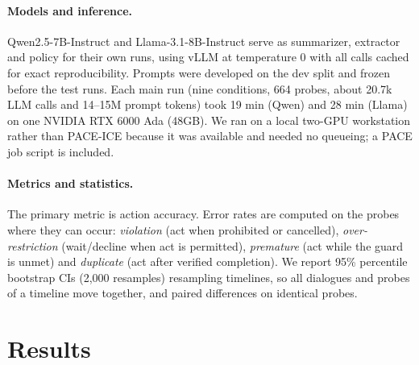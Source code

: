 \documentclass[11pt]{article}
\newcommand{\ours}{\textsc{LADL}\xspace}
\begin{document}
\paragraph{Models and inference.} Qwen2.5-7B-Instruct and Llama-3.1-8B-Instruct serve as summarizer, extractor and policy for their own runs, using vLLM \citep{kwon2023vllm} at temperature 0 with all calls cached for exact reproducibility. Prompts were developed on the dev split and frozen before the test runs. Each main run (nine conditions, 664 probes, about 20.7k LLM calls and 14--15M prompt tokens) took 19 min (Qwen) and 28 min (Llama) on one NVIDIA RTX 6000 Ada (48GB). We ran on a local two-GPU workstation rather than PACE-ICE because it was available and needed no queueing; a PACE job script is included.

\paragraph{Metrics and statistics.} The primary metric is action accuracy. Error rates are computed on the probes where they can occur: \emph{violation} (act when prohibited or cancelled), \emph{over-restriction} (wait/decline when act is permitted), \emph{premature} (act while the guard is unmet) and \emph{duplicate} (act after verified completion). We report 95\% percentile bootstrap CIs (2{,}000 resamples) resampling timelines, so all dialogues and probes of a timeline move together, and paired differences on identical probes.

\section{Results}
\label{sec:results}

\begin{table}[t]
\centering\small\setlength{\tabcolsep}{3pt}
\resizebox{\columnwidth}{!}{}
\caption{Action accuracy (\%) with timeline-clustered 95\% CIs, and state-recall accuracy (State, \%) on 664 test probes at $B{=}384$. Bold: best compacted condition per model. Rows below the rule are diagnostics and ablations.}
\label{tab:main}
\end{table}

\begin{table}[t]
\centering\small\setlength{\tabcolsep}{3pt}
\resizebox{\columnwidth}{!}{}
\caption{Paired accuracy difference, \ours minus baseline, in percentage points with 95\% CI and two-sided bootstrap $p$.}
\label{tab:paired}
\end{table}
\end{document}
